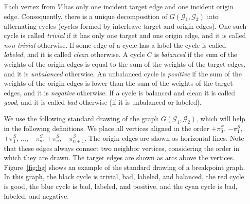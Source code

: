 \documentclass[12pt]{article}
\begin{document}
Each vertex from $V$ has only one incident target edge and one incident origin edge. Consequently, there is a unique decomposition of $G(\mathcal{G}_1,\mathcal{G}_2)$ into alternating cycles (cycles formed by interleave target and origin edges). One such cycle is called \emph{trivial} if it has only one target and one origin edge, and it is called \emph{non-trivial} otherwise. If some edge of a cycle has a label the cycle is called \emph{labeled}, and it is called \emph{clean} otherwise. A cycle $C$ is \emph{balanced} if the sum of the weights of the origin edges is equal to the sum of the weights of the target edges, and it is \emph{unbalanced} otherwise. An unbalanced cycle is \emph{positive} if the sum of the weights of the origin edges is lower than the sum of the weights of the target edges, and it is \emph{negative} otherwise. If a cycle is balanced and clean it is called \emph{good}, and it is called \emph{bad} otherwise (if it is unbalanced or labeled).

We use the following standard drawing of the graph $G(\mathcal{G}_1,\mathcal{G}_2)$, which will help in the following definitions. We place all vertices aligned in the order $+\pi^S_0$, $-\pi^S_1$, $+\pi^S_1$, $\ldots$, $-\pi^S_{n}$, $+\pi^S_{n}$, $-\pi^S_{n+1}$. The origin edges are shown as horizontal lines. Note that these edges always connect two neighbor vertices, considering the order in which they are drawn. The target edges are shown as arcs above the vertices. Figure~\ref{fig:bg} shows an example of the standard drawing of a breakpoint graph. In this graph, the black cycle is trivial, bad, labeled, and balanced, the red cycle is good, the blue cycle is bad, labeled, and positive, and the cyan cycle is bad, labeled, and negative.
\end{document}
